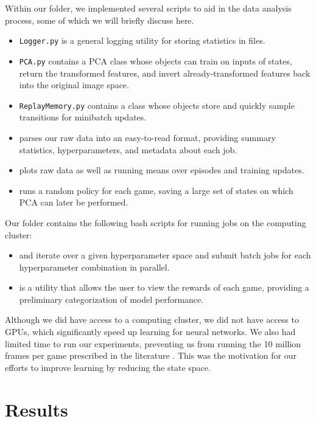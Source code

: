 \documentclass[11pt]{article}
\begin{document}
Within our  folder, we implemented several scripts to aid in the data analysis process, some of which we will briefly discuss here. 

\begin{itemize}
    \item \texttt{Logger.py} is a general logging utility for storing statistics in files. 
    \item \texttt{PCA.py} contains a PCA class whose objects can train on inputs of states, return the transformed features, and invert already-transformed features back into the original image space. 
    \item \texttt{ReplayMemory.py} contains a class whose objects store and quickly sample transitions for minibatch updates. 
    \item {} parses our raw data into an easy-to-read format, providing summary statistics, hyperparameters, and metadata about each job. 
    \item {} plots raw data as well as running means over episodes and training updates. 
    \item {} runs a random policy for each game, saving a large set of states on which PCA can later be performed. 
\end{itemize}
 
Our  folder contains the following bash scripts for running jobs on the computing cluster:

\begin{itemize}
    \item {} and  iterate over a given hyperparameter space and submit batch jobs for each hyperparameter combination in parallel.
    \item {} is a utility that allows the user to view the rewards of each game, providing a preliminary categorization of model performance. 
\end{itemize}

Although we did have access to a computing cluster, we did not have access to GPUs, which significantly speed up learning for neural networks. We also had limited time to run our experiments, preventing us from running the 10 million frames per game prescribed in the literature \cite{mnih2013playing, mnih2015human}. This was the motivation for our efforts to improve learning by reducing the state space.

\section{Results}
\end{document}

